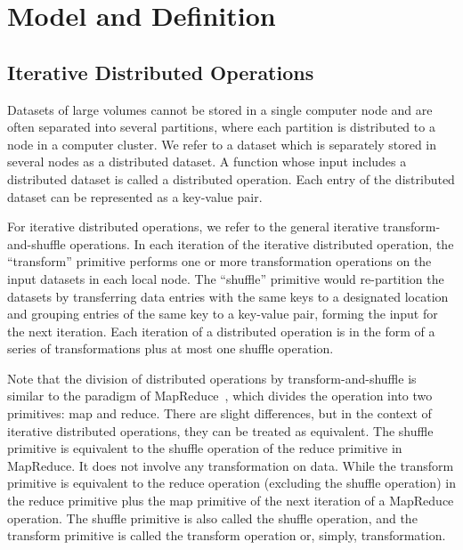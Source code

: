 \documentclass[10pt,journal,compsoc]{IEEEtran}
\begin{document}
\section{Model and Definition}\label{section:background}
\subsection{Iterative Distributed Operations}
Datasets of large volumes cannot be stored in a single computer node
and are often separated into several partitions, 
where each partition is distributed to a node in a computer cluster. 
We refer to a dataset which is separately stored in several nodes as a distributed dataset. 
A function whose input includes a distributed dataset is called a distributed operation.
Each entry of the distributed dataset can be represented as a key-value pair. 


For iterative distributed
operations, we refer to the general iterative transform-and-shuffle operations. 
In each iteration of the iterative distributed operation, 
the ``transform'' primitive performs one or more transformation operations on 
the input datasets in each local node.
The ``shuffle'' primitive would
re-partition the datasets by transferring data entries with
the same keys to a designated location and grouping entries of the same
key to a key-value pair, forming the input for the next iteration.
Each iteration of a distributed operation is in the form of a series of
transformations plus at most one shuffle operation.

Note that the division of distributed operations by
transform-and-shuffle is similar to the paradigm of
MapReduce~\cite{dean2008mapreduce}, which divides the operation into two
primitives: map and reduce.
There are slight differences, but in the context of iterative distributed
operations, they can be treated as equivalent.
The shuffle primitive is equivalent to the shuffle operation of the reduce primitive in MapReduce. 
It does not involve any transformation on data.
While the transform primitive is equivalent to the reduce operation
(excluding the shuffle operation) in the reduce primitive plus the map primitive of the next iteration of a MapReduce operation. 
The shuffle primitive is also called the shuffle operation,
and the transform primitive is called the transform operation or, simply, 
transformation.
\end{document}
